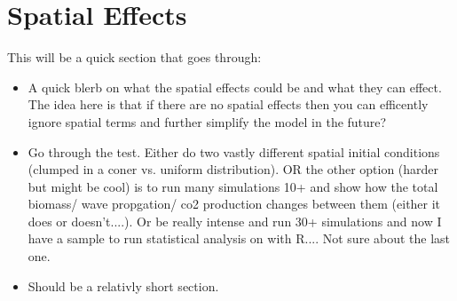 \section{Spatial Effects}

This will be a quick section that goes through:

\begin{itemize}
  \item A quick blerb on what the spatial effects could be and what they can effect. The idea here is that if there are no spatial effects then you can efficently ignore spatial terms and further simplify the model in the future?
  \item Go through the test. Either do two vastly different spatial initial conditions (clumped in a coner vs. uniform distribution). OR the other option (harder but might be cool) is to run many simulations 10+ and show how the total biomass/ wave propgation/ co2 production  changes between them (either it does or doesn't....). Or be really intense and run 30+ simulations and now I have a sample to run statistical analysis on with R.... Not sure about the last one.
  \item Should be a relativly short section.
\end{itemize}
